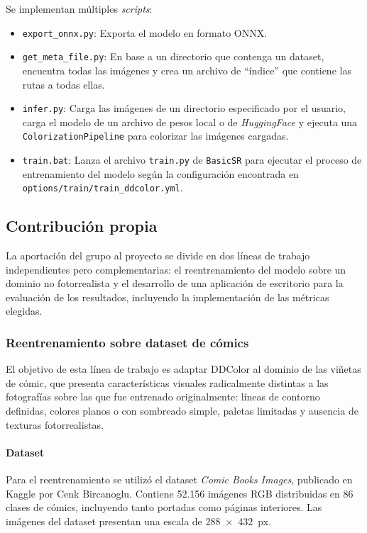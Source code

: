 \documentclass[a4paper]{article}
\begin{document}
Se implementan múltiples \textit{scripts}:

\begin{itemize}
  \item{\texttt{export\_onnx.py}: Exporta el modelo en formato ONNX.}
  \item{\texttt{get\_meta\_file.py}: En base a un directorio que contenga un dataset, encuentra todas las imágenes y crea un archivo de ``índice'' que contiene las rutas a todas ellas.}
  \item{\texttt{infer.py}: Carga las imágenes de un directorio especificado por el usuario, carga el modelo de un archivo de pesos local o de \textit{HuggingFace} y ejecuta una \texttt{ColorizationPipeline} para colorizar las imágenes cargadas.}
  \item{\texttt{train.bat}: Lanza el archivo \texttt{train.py} de \texttt{BasicSR} para ejecutar el proceso de entrenamiento del modelo según la configuración encontrada en \texttt{options/train/train\_ddcolor.yml}.}
\end{itemize}

\subsection{Contribución propia}

La aportación del grupo al proyecto se divide en dos líneas de trabajo independientes pero complementarias: el reentrenamiento del modelo sobre un dominio no fotorrealista y el desarrollo de una aplicación de escritorio para la evaluación de los resultados, incluyendo la implementación de las métricas elegidas.

\subsubsection{Reentrenamiento sobre dataset de cómics}

El objetivo de esta línea de trabajo es adaptar DDColor al dominio de las viñetas de cómic, que presenta características visuales radicalmente distintas a las fotografías sobre las que fue entrenado originalmente: líneas de contorno definidas, colores planos o con sombreado simple, paletas limitadas y ausencia de texturas fotorrealistas.

\paragraph{Dataset}

Para el reentrenamiento se utilizó el dataset \textit{Comic Books Images}, publicado en Kaggle por Cenk Bircanoglu. Contiene 52.156 imágenes RGB distribuidas en 86 clases de cómics, incluyendo tanto portadas como páginas interiores. Las imágenes del dataset presentan una escala de 288~×~432~px.
\end{document}
